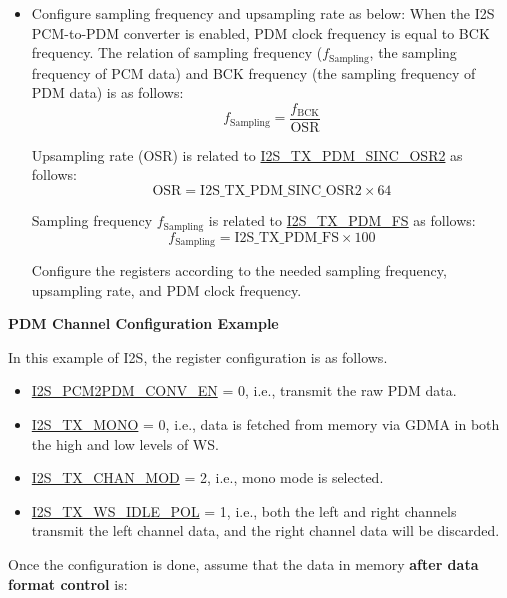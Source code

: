 \documentclass[main\_\_EN.tex]{subfiles}
\begin{document}
\begin{itemize}
    \item Configure sampling frequency and upsampling rate as below: \newline
    When the I2S PCM-to-PDM converter is enabled, PDM clock frequency is equal to BCK frequency. The relation of sampling frequency ($f_{\mathrm{Sampling}}$, the sampling frequency of PCM data) and BCK frequency (the sampling frequency of PDM data) is as follows:
    $$f_{\mathrm{Sampling}} = \frac{f_{\mathrm{BCK}}}{\mathrm{OSR}}$$
    
    Upsampling rate (OSR) is related to \hyperref[fielddesc:I2STXPDMSINCOSR2]{I2S\_TX\_PDM\_SINC\_OSR2} as follows:
    $$\mathrm{OSR} = \mathrm{\hyperref[fielddesc:I2STXPDMSINCOSR2]{I2S\_TX\_PDM\_SINC\_OSR2}} \times 64$$
    
    Sampling frequency $f_{\mathrm{Sampling}}$ is related to \hyperref[fielddesc:I2STXPDMFS]{I2S\_TX\_PDM\_FS} as follows:
    $$f_{\mathrm{Sampling}} = \mathrm{\hyperref[fielddesc:I2STXPDMFS]{I2S\_TX\_PDM\_FS}} \times 100$$
    
    Configure the registers according to the needed sampling frequency, upsampling rate, and PDM clock frequency.
\end{itemize}

\textbf{PDM Channel Configuration Example}

In this example of I2S, the register configuration is as follows.

\begin{itemize}
    \item \hyperref[fielddesc:I2SPCM2PDMCONVEN]{I2S\_PCM2PDM\_CONV\_EN} = 0, i.e., transmit the raw PDM data.
    \item \hyperref[fielddesc:I2STXMONO]{I2S\_TX\_MONO} = 0, i.e., data is fetched from memory via GDMA in both the high and low levels of WS.
    \item \hyperref[fielddesc:I2STXCHANMOD]{I2S\_TX\_CHAN\_MOD} = 2, i.e., mono mode is selected.
    \item \hyperref[fielddesc:I2STXWSIDLEPOL]{I2S\_TX\_WS\_IDLE\_POL} = 1, i.e., both the left and right channels transmit the left channel data, and the right channel data will be discarded.
\end{itemize}

Once the configuration is done, assume that the data in memory \textbf{after data format control} is:
\end{document}
